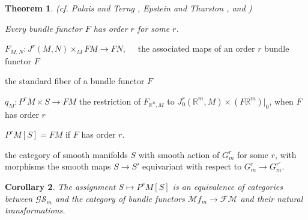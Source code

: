 \documentclass[12pt]{article}
\numberwithin{equation}{section}
\theoremstyle{plain}
\newtheorem{definition}{Definition}[section]
\newtheorem{corollary}[definition]{Corollary}
\newtheorem{theorem}[definition]{Theorem}
\theoremstyle{definition}
\newcommand{\R}{\mathbb{R}}
\newcommand{\ra}{\rightarrow}
\newcommand{\s}{\quad}
\renewcommand{\sp}[2][1.3cm]{\makebox[#1][l]{#2}}
\begin{document}
\begin{theorem} \emph{(cf. Palais and Terng \cite{palaisterng}, Epstein and Thurston \cite{epsteinthurston}, and \cite{kms})}

Every bundle functor $F$ has order $r$ for some $r$.
\end{theorem}

$F_{M,N}:J^{r}(M,N)\times_{M}FM\ra FN,\s$ the associated maps of an order $r$ bundle functor $F$

\sp[3.2cm]{$S:=(F\R^{m})|_{0}$} the standard fiber of a bundle functor $F$

$q_M:P^{r}M\times S\ra FM$ the restriction of $F_{\R^{n},M}$ to $J^{r}_{0}(\R^{m},M)\times (F\R^{m})|_{0}$, when $F$ has order $r$

$P^{r}M[S]=FM$ if $F$ has order $r$.

\sp{$\mathcal{GS}_{m}$} the category of smooth manifolds $S$ with smooth action of $G^{r}_{m}$ for some $r$, with morphisms the smooth maps $S\ra S'$ equivariant with respect to $G^{r}_{m}\ra G^{r'}_{m}$.

\begin{corollary}\label{bundlefuncToS} The assignment $S\mapsto P^{r}M[S]$ is an equivalence of categories between $\mathcal{GS}_{m}$ and the category of bundle functors $\mathcal{M}f_{m}\ra \mathcal{FM}$ and their natural transformations.
\end{corollary}








\end{document}
